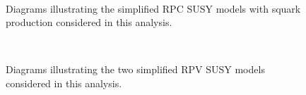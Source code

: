 \begin{figure}[htb!]
    \centering
     \\
\caption{Diagrams illustrating the simplified RPC SUSY models with squark production considered in this analysis.}
\label{fig:susy_diag_set2}
\end{figure}

\begin{figure}[htb!]
    \centering
     \\
\caption{Diagrams illustrating the two simplified RPV SUSY models considered in this analysis.}
\label{fig:susy_diag_set3}
\end{figure}


